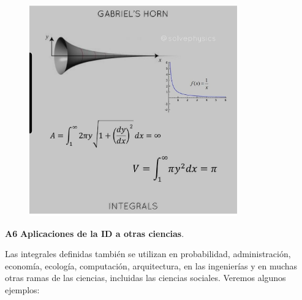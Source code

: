 \small{\rightline{\textcolor{gris}{Fuente: Wikipedia}}}

\begin{figure}[H]
	\centering
	\includegraphics[width=0.8\textwidth]{imagenes/imagenes08/T08IM36.png}
\end{figure}

\textbf{A6} \textbf{Aplicaciones de la ID a otras ciencias}.

Las integrales definidas también se utilizan en probabilidad, administración, economía, ecología, computación, arquitectura, en las ingenierías  y en muchas otras ramas de las ciencias, incluidas las ciencias sociales. Veremos algunos ejemplos:

\vspace{5mm}

